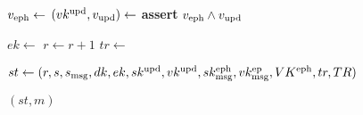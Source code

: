\begin{minipage}{\linewidth}
{\begin{algorithmic}[1]
    \State $v_\text{eph} \gets$
    \State $(vk^\text{upd},v_\text{upd}) \gets$
    \State \textbf{assert} $v_\text{eph} \wedge v_\text{upd}$

    \State $ek \gets$ 
    \State $r \gets r +1$
    \State $tr \gets$ 
    
    \State $st \gets (r,s,s_\text{msg},dk,ek,sk^\text{upd},vk^\text{upd},
                        sk_\text{msg}^\text{eph},vk_\text{msg}^\text{ep},VK^\text{eph},tr,TR)$

    \State \Return $(st,m)$
    \EndProcedure
  \end{algorithmic}
  }
\end{minipage}
